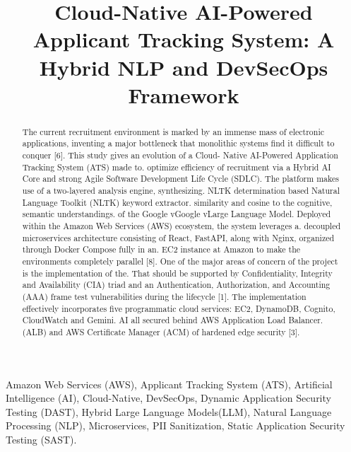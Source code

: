 \documentclass[conference]{IEEEtran}
\begin{document}
\title{Cloud-Native AI-Powered Applicant Tracking System: A Hybrid NLP and DevSecOps Framework}

\author{
}

\maketitle

\begin{abstract}
The current recruitment environment is marked by an immense mass of electronic applications, inventing a major bottleneck that monolithic systems find it difficult to conquer [6]. This study gives an evolution of a Cloud- Native AI-Powered Application Tracking System (ATS) made to. optimize efficiency of recruitment via a Hybrid AI Core and strong Agile Software Development Life Cycle (SDLC). The platform makes use of a two-layered analysis engine, synthesizing. NLTK determination based Natural Language Toolkit (NLTK) keyword extractor. similarity and cosine to the cognitive, semantic understandings. of the Google vGoogle vLarge Language Model. Deployed within the Amazon Web Services (AWS) ecosystem, the system leverages a. decoupled microservices architecture consisting of React, FastAPI, along with Nginx, organized through Docker Compose fully in an. EC2 instance at Amazon to make the environments completely parallel [8]. One of the major areas of concern of the project is the implementation of the. That should be supported by Confidentiality, Integrity and Availability (CIA) triad and an Authentication, Authorization, and Accounting (AAA) frame test vulnerabilities during the lifecycle [1]. The implementation effectively incorporates five programmatic cloud services: EC2, DynamoDB, Cognito, CloudWatch and Gemini. AI all secured behind AWS Application Load Balancer. (ALB) and AWS Certificate Manager (ACM) of hardened edge  security [3]. 
\end{abstract}

\begin{IEEEkeywords}
Amazon Web Services (AWS), Applicant Tracking System (ATS), Artificial Intelligence (AI), Cloud-Native, DevSecOps, Dynamic Application Security Testing (DAST), Hybrid Large Language Models(LLM), Natural Language Processing (NLP), Microservices, PII Sanitization, Static Application Security Testing (SAST).
\end{IEEEkeywords}
\end{document}
